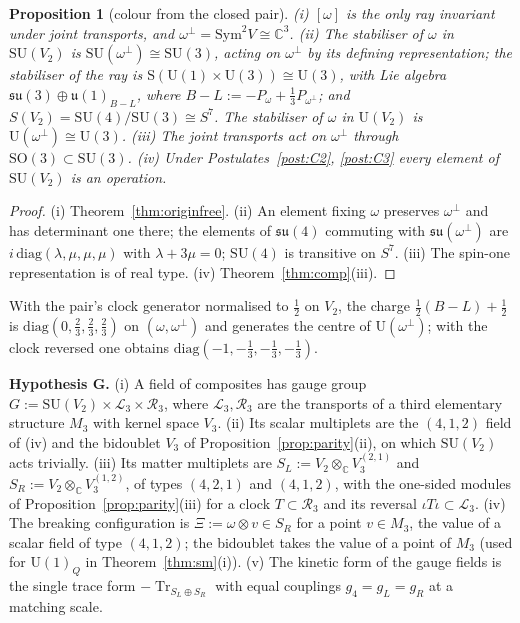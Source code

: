 \documentclass[aps,pra,onecolumn,superscriptaddress,nofootinbib,10pt]{revtex4-2}
\newtheorem{proposition}[theorem]{Proposition}
\theoremstyle{definition}
\theoremstyle{remark}
\newcommand{\C}{\mathbb{C}}
\newcommand{\su}{\mathfrak{su}}
\newcommand{\cL}{\mathcal{L}}
\newcommand{\cR}{\mathcal{R}}
\newcommand{\tr}{\operatorname{Tr}}
\newcommand{\SU}{\mathrm{SU}}
\newcommand{\SO}{\mathrm{SO}}
\newcommand{\U}{\mathrm{U}}
\begin{document}
\begin{proposition}[colour from the closed pair]\label{prop:pairsu3}
(i) $[\omega]$ is the only ray invariant under joint transports, and $\omega^\perp=\mathrm{Sym}^2V\cong\C^3$.
(ii) The stabiliser of $\omega$ in $\SU(V_2)$ is $\SU(\omega^\perp)\cong\SU(3)$, acting on $\omega^\perp$ by
its defining representation; the stabiliser of the ray is $\mathrm S(\U(1)\times\U(3))\cong\U(3)$, with
Lie algebra $\su(3)\oplus\mathfrak u(1)_{B-L}$, where $B-L:=-P_\omega+\tfrac13P_{\omega^\perp}$; and
$S(V_2)=\SU(4)/\SU(3)\cong S^7$.  The stabiliser of $\omega$ in $\U(V_2)$ is $\U(\omega^\perp)\cong\U(3)$.
(iii) The joint transports act on $\omega^\perp$ through $\SO(3)\subset\SU(3)$.
(iv) Under Postulates~\ref{post:C2}, \ref{post:C3} every element of $\SU(V_2)$ is an operation.
\end{proposition}
\begin{proof}
(i) Theorem~\ref{thm:originfree}.  (ii) An element fixing $\omega$ preserves $\omega^\perp$ and has
determinant one there; the elements of $\su(4)$ commuting with $\su(\omega^\perp)$ are
$i\,\mathrm{diag}(\lambda,\mu,\mu,\mu)$ with $\lambda+3\mu=0$; $\SU(4)$ is transitive on $S^7$.  (iii) The
spin-one representation is of real type.  (iv) Theorem~\ref{thm:comp}(iii).
\end{proof}
With the pair's clock generator normalised to $\tfrac12$ on $V_2$, the charge $\tfrac12(B-L)+\tfrac12$ is
$\mathrm{diag}(0,\tfrac23,\tfrac23,\tfrac23)$ on $(\omega,\omega^\perp)$ and generates the centre of
$\U(\omega^\perp)$; with the clock reversed one obtains $\mathrm{diag}(-1,-\tfrac13,-\tfrac13,-\tfrac13)$.

\smallskip\noindent\textbf{Hypothesis G.}  (i) A field of composites has gauge group
$G:=\SU(V_2)\times\cL_3\times\cR_3$, where $\cL_3,\cR_3$ are the transports of a third elementary
structure $M_3$ with kernel space $V_3$.  (ii) Its scalar multiplets are the $(4,1,2)$ field of (iv) and the bidoublet $V_3$ of
Proposition~\ref{prop:parity}(ii), on which $\SU(V_2)$ acts trivially.  (iii) Its matter multiplets are
$S_L:=V_2\otimes_\C V_3^{(2,1)}$ and $S_R:=V_2\otimes_\C V_3^{(1,2)}$, of types $(4,2,1)$ and $(4,1,2)$,
with the one-sided modules of Proposition~\ref{prop:parity}(iii) for a clock $T\subset\cR_3$ and its
reversal $\iota T\iota\subset\cL_3$.  (iv) The breaking configuration is $\Xi:=\omega\otimes v\in S_R$ for a
point $v\in M_3$, the value of a scalar field of type $(4,1,2)$; the bidoublet takes the value of a
point of $M_3$ (used for $\U(1)_Q$ in Theorem~\ref{thm:sm}(i)).  (v) The kinetic form of the gauge
fields is the single trace form $-\tr_{S_L\oplus S_R}$ with equal couplings $g_4=g_L=g_R$ at a matching
scale.
\end{document}
